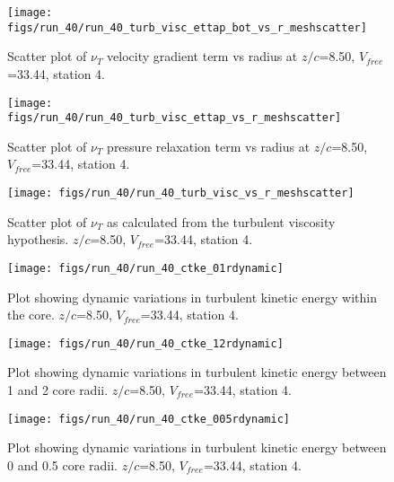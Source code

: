 \begin{figure}[H]
\centering
\texttt{[image: figs/run\_40/run\_40\_turb\_visc\_ettap\_bot\_vs\_r\_meshscatter]}
\caption{Scatter plot of $\nu_T$ velocity gradient term vs radius at $z/c$=8.50, $V_{free}$=33.44, station 4.}
\end{figure}


\begin{figure}[H]
\centering
\texttt{[image: figs/run\_40/run\_40\_turb\_visc\_ettap\_vs\_r\_meshscatter]}
\caption{Scatter plot of $\nu_T$ pressure relaxation term vs radius at $z/c$=8.50, $V_{free}$=33.44, station 4.}
\end{figure}


\begin{figure}[H]
\centering
\texttt{[image: figs/run\_40/run\_40\_turb\_visc\_vs\_r\_meshscatter]}
\caption{Scatter plot of $\nu_T$ as calculated from the turbulent viscosity hypothesis. $z/c$=8.50, $V_{free}$=33.44, station 4.}
\end{figure}


\begin{figure}[H]
\centering
\texttt{[image: figs/run\_40/run\_40\_ctke\_01rdynamic]}
\caption{Plot showing dynamic variations in turbulent kinetic energy within the core. $z/c$=8.50, $V_{free}$=33.44, station 4.}
\end{figure}


\begin{figure}[H]
\centering
\texttt{[image: figs/run\_40/run\_40\_ctke\_12rdynamic]}
\caption{Plot showing dynamic variations in turbulent kinetic energy between 1 and 2 core radii. $z/c$=8.50, $V_{free}$=33.44, station 4.}
\end{figure}


\begin{figure}[H]
\centering
\texttt{[image: figs/run\_40/run\_40\_ctke\_005rdynamic]}
\caption{Plot showing dynamic variations in turbulent kinetic energy between 0 and 0.5 core radii. $z/c$=8.50, $V_{free}$=33.44, station 4.}
\end{figure}


